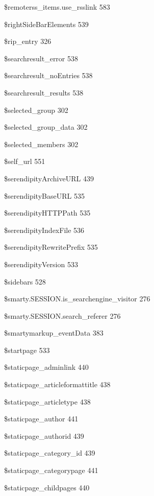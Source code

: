 \documentclass{book}
\renewcommand\subitem{\par}
\begin{document}
\begin{multicols}{2}
\begin{osp-index}
    \subitem \$remoterss\_items.use\_rsslink\hspace{1mm} 583
    \subitem \$rightSideBarElements\hspace{1mm} 539
    \subitem \$rip\_entry\hspace{1mm} 326
    \subitem \$searchresult\_error\hspace{1mm} 538
    \subitem \$searchresult\_noEntries\hspace{1mm} 538
    \subitem \$searchresult\_results\hspace{1mm} 538
    \subitem \$selected\_group\hspace{1mm} 302
    \subitem \$selected\_group\_data\hspace{1mm} 302
    \subitem \$selected\_members\hspace{1mm} 302
    \subitem \$self\_url\hspace{1mm} 551
    \subitem \$serendipityArchiveURL\hspace{1mm} 439
    \subitem \$serendipityBaseURL\hspace{1mm} 535
    \subitem \$serendipityHTTPPath\hspace{1mm} 535
    \subitem \$serendipityIndexFile\hspace{1mm} 536
    \subitem \$serendipityRewritePrefix\hspace{1mm} 535
    \subitem \$serendipityVersion\hspace{1mm} 533
    \subitem \$sidebars\hspace{1mm} 528
    \subitem \$smarty.SESSION.is\_searchengine\_visitor\hspace{1mm} 276
    \subitem \$smarty.SESSION.search\_referer\hspace{1mm} 276
    \subitem \$smartymarkup\_eventData\hspace{1mm} 383
    \subitem \$startpage\hspace{1mm} 533
    \subitem \$staticpage\_adminlink\hspace{1mm} 440
    \subitem \$staticpage\_articleformattitle\hspace{1mm} 438
    \subitem \$staticpage\_articletype\hspace{1mm} 438
    \subitem \$staticpage\_author\hspace{1mm} 441
    \subitem \$staticpage\_authorid\hspace{1mm} 439
    \subitem \$staticpage\_category\_id\hspace{1mm} 439
    \subitem \$staticpage\_categorypage\hspace{1mm} 441
    \subitem \$staticpage\_childpages\hspace{1mm} 440

\end{osp-index}
\end{multicols}
\end{document}
